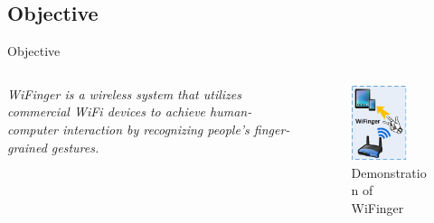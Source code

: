 \documentclass{beamer}
\begin{document}
\subsection{Objective}

\begin{frame}{Objective}
	\begin{columns}
		\begin{column}{0.5\textwidth}
  			\emph{WiFinger is a wireless system that utilizes commercial WiFi devices to achieve human-computer interaction by recognizing people's finger-grained gestures.} 
		\end{column}
		\begin{column}{0.5\textwidth}  %
    		\begin{center}
    			\begin{figure}
     				\includegraphics[width=0.75\textwidth]{Images/wifinger.jpg}
     				\caption{Demonstration of WiFinger~\cite{li2016wifinger}}
     			\end{figure}
     		\end{center}
		\end{column}
	\end{columns}
\end{frame}
\end{document}

